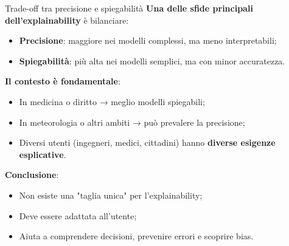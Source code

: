 \documentclass{beamer}
\begin{document}
\begin{frame}{Trade-off tra precisione e spiegabilità}
\small
\textbf{Una delle sfide principali dell’explainability} è bilanciare:
\begin{itemize}
    \item \textbf{Precisione}: maggiore nei modelli complessi, ma meno interpretabili;
    \item \textbf{Spiegabilità}: più alta nei modelli semplici, ma con minor accuratezza.
\end{itemize}

\vspace{0.2cm}
\textbf{Il contesto è fondamentale}:
\begin{itemize}
    \item In medicina o diritto → meglio modelli spiegabili;
    \item In meteorologia o altri ambiti → può prevalere la precisione;
    \item Diversi utenti (ingegneri, medici, cittadini) hanno \textbf{diverse esigenze esplicative}.
\end{itemize}

\vspace{0.2cm}
\textbf{Conclusione}:
\begin{itemize}
    \item Non esiste una "taglia unica" per l’explainability;
    \item Deve essere adattata all’utente;
    \item Aiuta a comprendere decisioni, prevenire errori e scoprire bias.
\end{itemize}
\end{frame}
%
%
\end{document}

